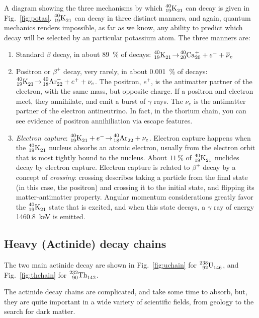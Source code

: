 \documentclass[12pt]{article}
\def\elem#1#2#3#4#5{{%
   \phantom{{}^{#2}_{#3}}%
   {\vphantom{\rm#1}}^{\llapscr{#2}}_{\llapscr{#3}}%
   {\rm#1}^{#4}_{#5}%
}}
\def\llapscr#1{\llap{$\scriptstyle#1$}}
\begin{document}
A diagram showing the three mechanisms by which $\elem{K}{40}{19}{}{21}$ can decay is given in Fig.~\ref{fig:potas}.  $\elem{K}{40}{19}{}{21}$ can decay in three distinct manners, and again, quantum mechanics renders impossible, as far as we know, any ability to predict which decay will be selected by an particular potassium atom.  The three manners are:

\begin{enumerate}
\item Standard $\beta$ decay, in about 89~\% of decays: $\elem{K}{40}{19}{}{21}\!\to\!\elem{Ca}{40}{20}{+}{20}+e^-+\overline{\nu}_e$
\item Positron or $\beta^+$ decay, very rarely, in about 0.001~\% of decays: $\elem{K}{40}{19}{}{21}\!\to\!\elem{Ar}{40}{18}{-}{22}+e^++\nu_e$.  The positron, $e^+$, is the antimatter partner of the electron, with the same mass, but opposite charge.  If a positron and electron meet, they annihilate, and emit a burst of $\gamma$ rays.  The $\nu_e$ is the antimatter partner of the electron antineutrino.  In fact, in the thorium chain, you can see evidence of positron annihiliation via escape features.
\item \emph{Electron capture}: $\elem{K}{40}{19}{}{21}+e^-\!\to\!\elem{Ar}{40}{18}{}{22}+\nu_e$.  Electron capture happens when the $\elem{K}{40}{19}{}{21}$ nucleus absorbs an atomic electron, usually from the electron orbit that is most tightly bound to the nucleus. About $11\,$\% of $\elem{K}{40}{19}{}{21}$ nuclides decay by electron capture.  Electron capture is related to $\beta^+$ decay by a concept of \emph{crossing}: crossing describes taking a particle from the final state (in this case, the positron) and crossing it to the initial state, and flipping its matter-antimatter property.   Angular momentum considerations greatly favor the $\elem{K}{40}{19}{}{21}$ state that is excited, and when this state decays, a $\gamma$ ray of energy 1460.8~keV is emitted.
\end{enumerate}

\subsection{Heavy (Actinide) decay chains}

The two main actinide decay are shown in Fig.~\ref{fig:uchain} for $\elem{U}{238}{92}{}{146}$, and Fig.~\ref{fig:thchain} for 
$\elem{Th}{232}{90}{}{142}$.

The actinide decay chains are complicated, and take some time to absorb, but, they are quite important in a wide variety of scientific fields, from geology to the search for dark matter.
\end{document}
